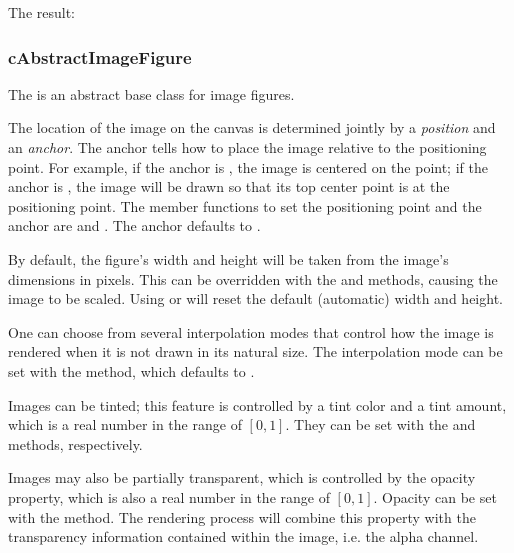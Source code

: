 
The result:

\begin{center}

\end{center}


\subsubsection{cAbstractImageFigure}
\label{sec:graphics:abstractimagefigure}

The  is an abstract base class for image figures.

The location of the image on the canvas is determined jointly by a
\textit{position} and an \textit{anchor}. The anchor tells how to
place the image relative to the positioning point. For example,
if the anchor is , the image is centered on the point;
if the anchor is , the image will be drawn so that its top
center point is at the positioning point. The member functions to set the
positioning point and the anchor are  and
. The anchor defaults to .

By default, the figure's width and height will be taken from the image's
dimensions in pixels. This can be overridden with the  and
 methods, causing the image to be scaled. Using
 or  will reset the default (automatic) width
and height.

One can choose from several interpolation modes that control how the image
is rendered when it is not drawn in its natural size. The interpolation mode
can be set with the  method, which defaults to
.

Images can be tinted; this feature is controlled by a tint color and a tint
amount, which is a real number in the range of $[0,1]$. They can be set with the
 and  methods, respectively.

Images may also be partially transparent, which is controlled by the opacity
property, which is also a real number in the range of $[0,1]$. Opacity can be set with the
 method. The rendering process will combine this
property with the transparency information contained within the image, i.e.
the alpha channel.


